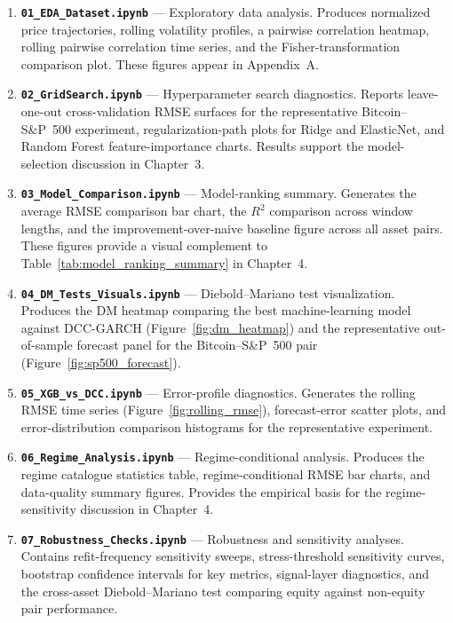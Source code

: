 \begin{enumerate}
    \item \textbf{\texttt{01\_EDA\_Dataset.ipynb}} --- Exploratory data analysis. Produces normalized price trajectories, rolling volatility profiles, a pairwise correlation heatmap, rolling pairwise correlation time series, and the Fisher-transformation comparison plot. These figures appear in Appendix~A.

    \item \textbf{\texttt{02\_GridSearch.ipynb}} --- Hyperparameter search diagnostics. Reports leave-one-out cross-validation RMSE surfaces for the representative Bitcoin--S\&P~500 experiment, regularization-path plots for Ridge and ElasticNet, and Random Forest feature-importance charts. Results support the model-selection discussion in Chapter~3.

    \item \textbf{\texttt{03\_Model\_Comparison.ipynb}} --- Model-ranking summary. Generates the average RMSE comparison bar chart, the $R^2$ comparison across window lengths, and the improvement-over-naive baseline figure across all asset pairs. These figures provide a visual complement to Table~\ref{tab:model_ranking_summary} in Chapter~4.

    \item \textbf{\texttt{04\_DM\_Tests\_Visuals.ipynb}} --- Diebold--Mariano test visualization. Produces the DM heatmap comparing the best machine-learning model against DCC-GARCH (Figure~\ref{fig:dm_heatmap}) and the representative out-of-sample forecast panel for the Bitcoin--S\&P~500 pair (Figure~\ref{fig:sp500_forecast}).

    \item \textbf{\texttt{05\_XGB\_vs\_DCC.ipynb}} --- Error-profile diagnostics. Generates the rolling RMSE time series (Figure~\ref{fig:rolling_rmse}), forecast-error scatter plots, and error-distribution comparison histograms for the representative experiment.

    \item \textbf{\texttt{06\_Regime\_Analysis.ipynb}} --- Regime-conditional analysis. Produces the regime catalogue statistics table, regime-conditional RMSE bar charts, and data-quality summary figures. Provides the empirical basis for the regime-sensitivity discussion in Chapter~4.

    \item \textbf{\texttt{07\_Robustness\_Checks.ipynb}} --- Robustness and sensitivity analyses. Contains refit-frequency sensitivity sweeps, stress-threshold sensitivity curves, bootstrap confidence intervals for key metrics, signal-layer diagnostics, and the cross-asset Diebold--Mariano test comparing equity against non-equity pair performance.
\end{enumerate}

